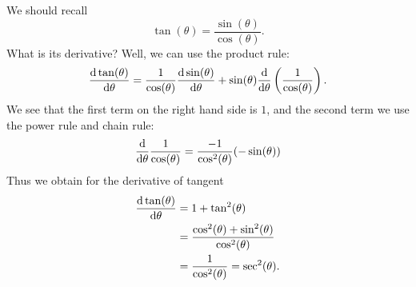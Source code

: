 We should recall
\begin{equation}
\tan(\theta)=\frac{\sin(\theta)}{\cos(\theta)}.
\end{equation}
What is its derivative? Well, we can use the product rule:
\begin{equation}
\frac{\mathrm{d}\tan(\theta)}{\mathrm{d}\theta}=
\frac{1}{\cos(\theta)}\frac{\mathrm{d}\sin(\theta)}{\mathrm{d}\theta}
+\sin(\theta)\frac{\mathrm{d}}{\mathrm{d}\theta}\left(\frac{1}{\cos(\theta)}\right).
\end{equation}
We see that the first term on the right hand side is $1$, and the
second term we use the power rule and chain rule:
\begin{equation}
\frac{\mathrm{d}}{\mathrm{d}\theta}\frac{1}{\cos(\theta)}=\frac{-1}{\cos^{2}(\theta)}(-\sin(\theta))
\end{equation}
Thus we obtain for the derivative of tangent
\begin{equation}
\begin{split}
\frac{\mathrm{d}\tan(\theta)}{\mathrm{d}\theta}&=1+\tan^{2}(\theta)\\
&=\frac{\cos^{2}(\theta)+\sin^{2}(\theta)}{\cos^{2}(\theta)}\\
&=\frac{1}{\cos^{2}(\theta)}=\sec^{2}(\theta).
\end{split}
\end{equation}


